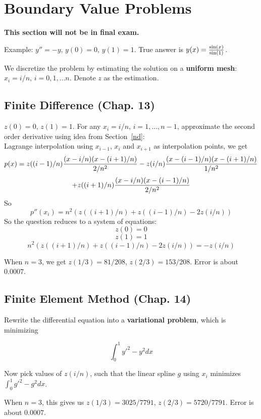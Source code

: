 \documentclass{article} %
\theoremstyle{break}
\begin{document}
\section{Boundary Value Problems}

{\bf This section will not be in final exam.}

Example: $y''=-y$, $y(0)=0$, $y(1)=1$. True answer is $y(x)={\sin(x)\over\sin(1)}$.

We discretize the problem by estimating the solution on a {\bf uniform mesh}: $x_i=i/n$, $i=0, 1, \dots n$. Denote $z$ as the estimation.

\subsection{Finite Difference (Chap. 13)}

$z(0)=0$, $z(1)=1$. For any $x_i=i/n$, $i=1, \dots, n-1$, approximate the second order derivative using idea from Section~\ref{nd}:\\

Lagrange interpolation using $x_{i-1}$, $x_i$ and $x_{i+1}$ as interpolation points, we get
  \[p(x)=z((i-1)/n){(x-i/n)(x-(i+1)/n)\over 2/n^2}-z(i/n){(x-(i-1)/n)(x-(i+1)/n)\over 1/n^2}\]
  \[+z((i+1)/n){(x-i/n)(x-(i-1)/n)\over 2/n^2}\]
  So
  \[p''(x_i)=n^2(z((i+1)/n)+z((i-1)/n)-2z(i/n))\]
  So the question reduces to a system of equations:
  \[z(0)=0\]
  \[z(1)=1\]
  \[n^2(z((i+1)/n)+z((i-1)/n)-2z(i/n))=-z(i/n)\]

  When $n=3$, we get $z(1/3)=81/208$, $z(2/3)=153/208$. Error is about $0.0007$.

  
  \subsection{Finite Element Method (Chap. 14)}
  
Rewrite the differential equation into a {\bf variational problem}, which is minimizing
  
\[\int_0^1y'^2-y^2 dx\]

Now pick values of $z(i/n)$, such that the linear spline $g$ using $x_i$ minimizes $\int_0^1g'^2-g^2dx$.

When $n=3$, this gives us $z(1/3)=3025/7791$, $z(2/3)=5720/7791$. Error is about $0.0007$.
\end{document}
